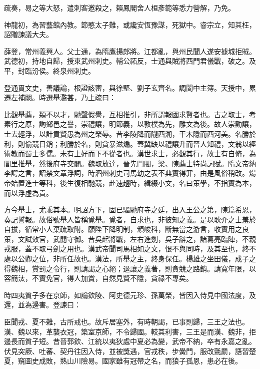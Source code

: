\begin{pinyinscope}
 疏奏，易之等大怒，遣刺客邀殺之，賴鳳閣舍人桓彥範等悉力營解，乃免。



 神龍初，為習藝館內教。節愍太子難，或讒安恆豫謀，死獄中。睿宗立，知其枉，詔贈諫議大夫。



 薛登，常州義興人。父士通，為隋鷹揚郎將。江都亂，與州民聞人遂安據城拒賊。武德初，持地自歸，授東武州刺史。輔公祏反，士通與賊將西門君儀戰，破之。及平，封臨汾侯。終泉州刺史。



 登通貫文史，善議論，根證該審，與徐堅、劉子玄齊名。調閬中主簿。天授中，累遷左補闕。時選舉濫甚，乃上疏曰：



 比觀舉薦，類不以才，馳聲假譽，互相推引，非所謂報國求賢者也。古之取士，考素行之原，詢鄉邑之譽，崇禮讓，明節義，以敦樸為先，雕文為後。故人崇勸讓，士去輕浮，以計貢賢愚為州之榮辱。昔李陵降而隴西溯，干木隱而西河美。名勝於利，則偷競日銷；利勝於名，則貪暴滋煽。蓋冀缺以禮讓升而晉人知禮，文翁以經術教而蜀士多儒。未有上好而下不從者也。漢世求士，必觀其行，故士有自脩，為閭里推舉，然後府寺交闢。魏取放達，晉先門閥，梁、陳薦士特尚詞賦。隋文帝納李諤之言，詔禁文章浮詞，時泗州刺史司馬幼之表不典實得罪，由是風俗稍改。煬帝始置進士等科，後生復相馳競，赴速趨時，緝綴小文，名曰策學，不指實為本，而以浮虛為貴。



 方今舉士，尤乖其本。明詔方下，固已驅馳府寺之廷，出入王公之第，陳篇希恩，奏記誓報。故俗號舉人皆稱覓舉。覓者，自求也，非彼知之義。是以耿介之士羞於自拔，循常小人棄疏取附。願陛下降明制，頒峻科，斷無當之游言，收實用之良策，文試效官，武閱守御。昔吳起將戰，左右進劍，吳子辭之，諸葛亮臨陣，不親戎服，蓋不取弓劍之用也。漢武帝聞司馬相如之文，恨不與同時，及其至也，終不處以公卿之位，非所任故也。漢法，所舉之主，終身保任。楊雄之坐田儀，成子之得魏相，賞罰之令行，則請謁之心絕；退讓之義著，則貪競之路銷。請寬年限，以容簡汰，不實免官，得人加賞，自然見賢不隱，貪祿不專矣。



 時四夷質子多在京師，如論欽陵、阿史德元珍、孫萬榮，皆因入侍見中國法度，及還，並為邊害。登諫曰：



 臣聞戎、夏不雜，古所戒也。故斥居塞外，有時朝謁，已事則歸，三王之法也。漢、魏以來，革襲衣冠，築室京師，不令歸國。較其利害，三王是而漢、魏非，拒邊長而質子短。昔晉郭欽、江統以夷狄處中夏必為變，武帝不納，卒有永嘉之亂。伏見突厥、吐蕃、契丹往因入侍，並被獎遇，官戎秩，步黌門，服改氈罽，語習楚夏，窺圖史成敗，熟山川險易。國家雖有冠帶之名，而狼子孤恩，患必在後。




\end{pinyinscope}
